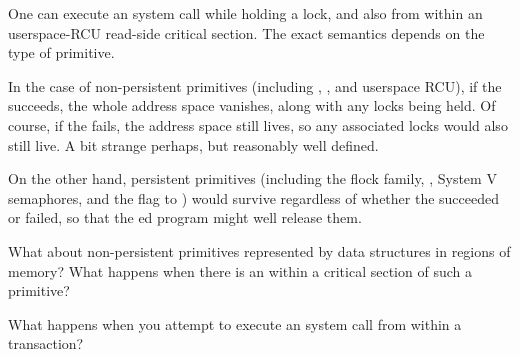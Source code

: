 One can execute an  system call while holding a lock, and
also from within an userspace-RCU read-side critical section.
The exact semantics depends on the type of primitive.

In the case of non-persistent primitives (including
, , and userspace RCU),
if the  succeeds, the whole address space vanishes, along
with any locks being held.
Of course, if the  fails, the address space still lives,
so any associated locks would also still live.
A bit strange perhaps, but reasonably well defined.

On the other hand, persistent primitives (including the flock family,
, System V semaphores, and the  flag to
) would survive regardless of whether the 
succeeded or failed, so that the ed program might well
release them.

\QuickQuiz{}
	What about non-persistent primitives represented by data
	structures in  regions of memory?
	What happens when there is an  within a critical
	section of such a primitive?
 \QuickQuizEnd

What happens when you attempt to execute an  system call
from within a transaction?

